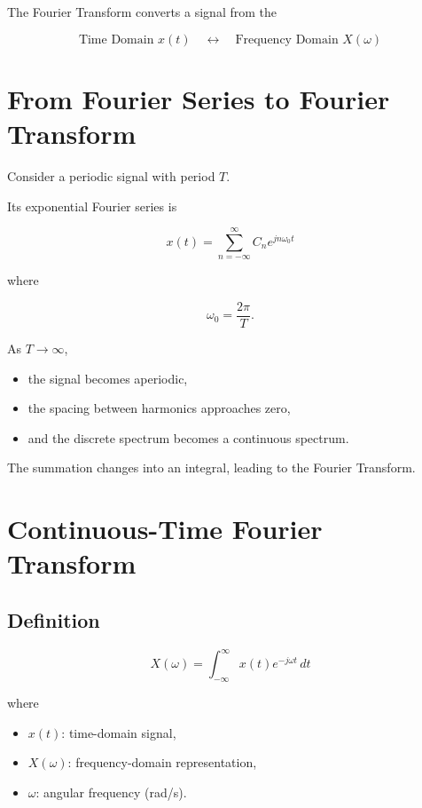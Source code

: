 The Fourier Transform converts a signal from the

\[
\boxed{
\text{Time Domain }x(t)
\quad \longleftrightarrow \quad
\text{Frequency Domain }X(\omega)
}
\]


\section{From Fourier Series to Fourier Transform}

Consider a periodic signal with period \(T\).

Its exponential Fourier series is

\[
x(t)=\sum_{n=-\infty}^{\infty}C_n e^{jn\omega_0 t}
\]

where

\[
\omega_0=\frac{2\pi}{T}.
\]

As \(T\to\infty\),

\begin{itemize}
\item the signal becomes aperiodic,
\item the spacing between harmonics approaches zero,
\item and the discrete spectrum becomes a continuous spectrum.
\end{itemize}

The summation changes into an integral, leading to the Fourier Transform.


\section{Continuous-Time Fourier Transform}


\subsection{Definition}

\[
\boxed{
X(\omega)=
\int_{-\infty}^{\infty}
x(t)e^{-j\omega t}\,dt
}
\]

where

\begin{itemize}
\item \(x(t)\): time-domain signal,
\item \(X(\omega)\): frequency-domain representation,
\item \(\omega\): angular frequency (rad/s).
\end{itemize}


